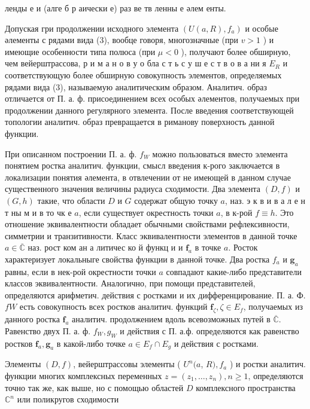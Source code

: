 \documentclass[10pt]{article}
\begin{document}
ленды е и (алге б р аически е) раз ве тв ленны е әлем енты.



Допуская гри продолжении исходного элемента $\left(U(a, R), f_{a}\right)$ и особые әлементы с рядами вида (3), вообце говоря, многозначные (при $v>1$ ) и имеющие особенности типа полюса (при $\mu<0$ ), получают более обширную, чем вейерштрассова, р и м а н о в у о бла с т ь с у ш е с т в о в а ни я $E_{R}$ и соответствующую более обширную совокупность элементов, определяемых рядами вида (3), называемую аналитическим образом. Аналитич. образ отличается от П. а. ф. присоединением всех особых әлементов, получаемых при продолжении данного регулярного элемента. После введения соответствующей топологии аналитич. образ превращается в риманову поверхность данной функции.



При описанном построении П. а. ф. $f_{W}$ можно пользоваться вместо элемента понятием ростка аналитич. функции, смысл введения к-рого заключается в локализации понятия әлемента, в отвлечении от не имеющей в данном случае существенного значения величины радиуса сходимости. Два элемента $(D, f)$ и $(G, h)$ такие, что области $D$ и $G$ содержат общую точку $a$, наз. э к в и в а л е н т ны м и в то чк е $a$, если существует окрестность точки $a$, в к-рой $f \equiv h$. Это отношение эквивалентности обладает обычными свойствами рефлексивности, симметрии и транзитивности. Класс эквивалентности элементов в данной точке $a \in \overline{\mathbb{C}}$ наз. рост ком ан а литичес ко й функц и и $\mathbf{f}_{a}$ в точке $a$. Росток характеризует локальныге свойства функции в данной точке. Два ростка $f_{a}$ и $\mathbf{g}_{a}$ равны, если в нек-рой окрестности точки $a$ совпадают какие-либо представители классов эквивалентности. Аналогично, при помощи представителей, определяются арифметич. действия с ростками и их дифференцирование. П. а. Ф. $f W$ есть совокупность всех ростков аналитич. функций $\mathbf{f}_{\zeta}, \zeta \in E_{f}$, получаемых из данного ростка $\mathbf{f}_{a}$ аналитич. продолжением вдоль всевозможных путей в $\overline{\mathbb{C}}$. Равенство двух П. а. ф. $f_{W}, g_{W}$ и действия с П. а.ф. определяются как равенство ростков $\mathbf{f}_{a}, \mathbf{g}_{a}$ в какой-либо точке $a \in E_{f} \cap E_{g}$ и действия с ростками.



Элементы $(D, f)$, вейерштрассовы элементы ( $U^{n}(a$, $R), f_{a}$ ) и ростки аналитич. функции многих комплексных переменных $z=\left(z_{1}, \ldots, z_{n}\right), n \geqslant 1$, определяются точно так же, как выше, но с помощью областей $D$ комплексного пространства $\mathbb{C}^{n}$ или поликругов сходимости
\end{document}
